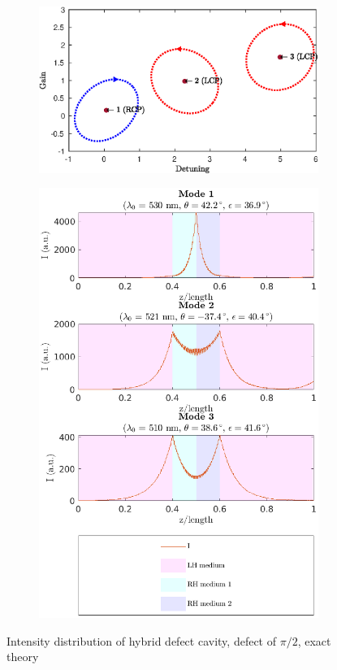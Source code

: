 \begin{figure}
	\centering
	\begin{subfigure}{\linewidth}
		\includegraphics[width=\linewidth]{plots/hybrid_defect/pi_2/modes_found_oseen}
		\caption{}
	\end{subfigure}
	\begin{subfigure}{\linewidth}
		\includegraphics[width=\linewidth]{plots/hybrid_defect/pi_2/intensity_distribution_oseen}
		\caption{}
	\end{subfigure}
	\caption[Intensity distribution of hybrid defect cavity, defect of $\pi/2$, exact theory]{Intensity distribution of hybrid defect cavity, defect of $\pi/2$, exact theory}
	\label{fig:hybrid_defect_pi2_intensity_appendix}
\end{figure}
